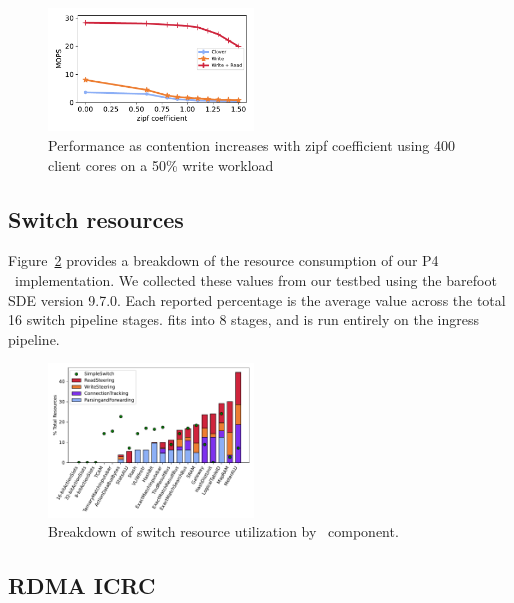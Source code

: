 \begin{figure}
  \centering
  \includegraphics[width=0.485\textwidth]{fig/contention.pdf}

    \caption{Performance as contention increases with zipf coefficient using 400
    client cores on a 50\% write workload}

    \label{fig:contention}
\end{figure}

\subsection{Switch resources}
\label{sec:appendix_resources}

Figure~\ref{fig:switch_resources} provides a breakdown of the resource
consumption of our P4 \sword\ implementation. We collected these
values from our testbed using the barefoot SDE version 9.7.0. Each
reported percentage is the average value across the total 16 switch
pipeline stages. {\sword} fits into 8 stages, and is run entirely on
the ingress pipeline.

\begin{figure}[t]
    \includegraphics[width=0.485\textwidth]{fig/switch_resources.pdf}
    \caption{Breakdown of switch resource utilization by \sword\ component.}
    \label{fig:switch_resources}
\end{figure}



\subsection{RDMA ICRC}
\label{sec:appendix_icrc}

